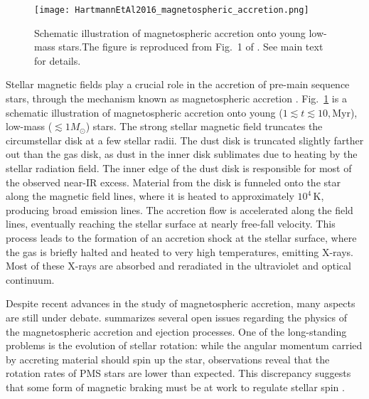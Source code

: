 \documentclass[12pt,a4paper]{article}
\newcommand{\mr}{\mathrm}
\begin{document}
\begin{figure}
  \centering
  \texttt{[image: HartmannEtAl2016\_magnetospheric\_accretion.png]}
  \caption{Schematic illustration of magnetospheric accretion onto young low-mass stars.The figure is reproduced from Fig.~1 of \textcite{HartmannEtAl2016}. See main text for details.}
  \label{fig:magnetospheric_accretion}
\end{figure}

Stellar magnetic fields play a crucial role in the accretion of pre-main sequence stars, through the mechanism known as magnetospheric accretion \parencite[See, for example,][for a review]{HartmannEtAl2016}. Fig.~\ref{fig:magnetospheric_accretion} is a schematic illustration of magnetospheric accretion onto young ($1 \lesssim t \lesssim 10,\mr{Myr}$), low-mass ($\lesssim 1 M_\odot$) stars. The strong stellar magnetic field truncates the circumstellar disk at a few stellar radii. The dust disk is truncated slightly farther out than the gas disk, as dust in the inner disk sublimates due to heating by the stellar radiation field. The inner edge of the dust disk is responsible for most of the observed near-IR excess. Material from the disk is funneled onto the star along the magnetic field lines, where it is heated to approximately $10^4\,\mr{K}$, producing broad emission lines. The accretion flow is accelerated along the field lines, eventually reaching the stellar surface at nearly free-fall velocity. This process leads to the formation of an accretion shock at the stellar surface, where the gas is briefly halted and heated to very high temperatures, emitting X-rays. Most of these X-rays are absorbed and reradiated in the ultraviolet and optical continuum.

Despite recent advances in the study of magnetospheric accretion, many aspects are still under debate. \textcite{Bouvier2014} summarizes several open issues regarding the physics of the magnetospheric accretion and ejection processes. One of the long-standing problems is the evolution of stellar rotation: while the angular momentum carried by accreting material should spin up the star, observations reveal that the rotation rates of PMS stars are lower than expected. This discrepancy suggests that some form of magnetic braking must be at work to regulate stellar spin \parencite[e.g.,][]{HerbstEtAl2007}.
\end{document}
